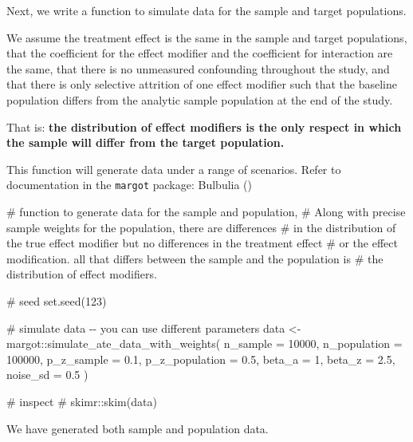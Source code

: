 \documentclass[
  single column]{article}
\newenvironment{Shaded}{\begin{snugshade}}{\end{snugshade}}
\newcommand{\AttributeTok}[1]{\textcolor[rgb]{0.40,0.45,0.13}{#1}}
\newcommand{\CommentTok}[1]{\textcolor[rgb]{0.37,0.37,0.37}{#1}}
\newcommand{\DecValTok}[1]{\textcolor[rgb]{0.68,0.00,0.00}{#1}}
\newcommand{\FloatTok}[1]{\textcolor[rgb]{0.68,0.00,0.00}{#1}}
\newcommand{\FunctionTok}[1]{\textcolor[rgb]{0.28,0.35,0.67}{#1}}
\newcommand{\NormalTok}[1]{\textcolor[rgb]{0.00,0.23,0.31}{#1}}
\newcommand{\OtherTok}[1]{\textcolor[rgb]{0.00,0.23,0.31}{#1}}
\newcommand{\SpecialCharTok}[1]{\textcolor[rgb]{0.37,0.37,0.37}{#1}}
\begin{document}
Next, we write a function to simulate data for the sample and target
populations.

We assume the treatment effect is the same in the sample and target
populations, that the coefficient for the effect modifier and the
coefficient for interaction are the same, that there is no unmeasured
confounding throughout the study, and that there is only selective
attrition of one effect modifier such that the baseline population
differs from the analytic sample population at the end of the study.

That is: \textbf{the distribution of effect modifiers is the only
respect in which the sample will differ from the target population.}

This function will generate data under a range of scenarios. Refer to
documentation in the \texttt{margot} package: Bulbulia
()

\begin{Shaded}
\begin{Highlighting}[]
\CommentTok{\# function to generate data for the sample and population, }
\CommentTok{\# Along with precise sample weights for the population, there are differences }
\CommentTok{\# in the distribution of the true effect modifier but no differences in the treatment effect }
\CommentTok{\# or the effect modification. all that differs between the sample and the population is }
\CommentTok{\# the distribution of effect modifiers.}

\CommentTok{\# seed}
\FunctionTok{set.seed}\NormalTok{(}\DecValTok{123}\NormalTok{)}

\CommentTok{\# simulate data {-}{-} you can use different parameters}
\NormalTok{data }\OtherTok{\textless{}{-}}\NormalTok{ margot}\SpecialCharTok{::}\FunctionTok{simulate\_ate\_data\_with\_weights}\NormalTok{(}
  \AttributeTok{n\_sample =} \DecValTok{10000}\NormalTok{,}
  \AttributeTok{n\_population =} \DecValTok{100000}\NormalTok{,}
  \AttributeTok{p\_z\_sample =} \FloatTok{0.1}\NormalTok{,}
  \AttributeTok{p\_z\_population =} \FloatTok{0.5}\NormalTok{,}
  \AttributeTok{beta\_a =} \DecValTok{1}\NormalTok{,}
  \AttributeTok{beta\_z =} \FloatTok{2.5}\NormalTok{,}
  \AttributeTok{noise\_sd =} \FloatTok{0.5}
\NormalTok{)}

\CommentTok{\# inspect}
\CommentTok{\# skimr::skim(data)}
\end{Highlighting}
\end{Shaded}

We have generated both sample and population data.
\end{document}
